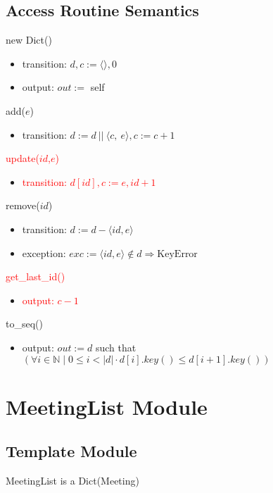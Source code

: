 \documentclass[12pt, titlepage]{article}
\begin{document}
\subsection*{Access Routine Semantics}
\noindent new Dict()
\begin{itemize}
    \item transition: $d, c := \langle \rangle, 0$
    
    \item output: $out :=$ self
\end{itemize}

\noindent add($e$)
\begin{itemize}
    \item transition: $d :=  d\ ||\ \langle c,\ e \rangle, c := c + 1$
\end{itemize}

\noindent\textcolor{red}{update($id$,$e$)}
\begin{itemize}
    \item \textcolor{red}{transition: $d[id],c := e,id+1$}
\end{itemize}

\noindent remove($id$)
\begin{itemize}
    \item transition: $d :=  d - \langle id, e \rangle$
    \item exception: $exc := \langle id, e \rangle \notin d \Rightarrow \text{KeyError}$
\end{itemize}

\noindent\textcolor{red}{get\_last\_id()}
\begin{itemize}
    \item \textcolor{red}{output: $c - 1$}
\end{itemize}

\noindent to\_seq()
\begin{itemize}
    \item output: $out := d$ such that $(\forall i \in \mathbb{N} \mid 0 \leq i < |d| \cdot d[i].key() \leq d[i + 1].key())$
\end{itemize}

\newpage
\section* {MeetingList Module}

\subsection*{Template Module}
MeetingList is a Dict(Meeting)
\end{document}
